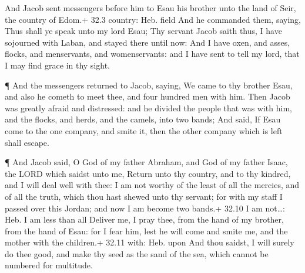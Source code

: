  And Jacob sent messengers before him to Esau his brother
unto the land of Seir, the country of Edom.+ 32.3 country: Heb. field
 And he commanded them, saying, Thus shall ye speak unto my
lord Esau; Thy servant Jacob saith thus, I have sojourned with Laban,
and stayed there until now:  And I have oxen, and asses,
flocks, and menservants, and womenservants: and I have sent to tell my
lord, that I may find grace in thy sight.

 ¶ And the messengers returned to Jacob, saying, We came to
thy brother Esau, and also he cometh to meet thee, and four hundred men
with him.  Then Jacob was greatly afraid and distressed: and
he divided the people that was with him, and the flocks, and herds, and
the camels, into two bands;  And said, If Esau come to the
one company, and smite it, then the other company which is left shall
escape.

 ¶ And Jacob said, O God of my father Abraham, and God of my
father Isaac, the LORD which saidst unto me, Return unto thy country,
and to thy kindred, and I will deal well with thee:  I am
not worthy of the least of all the mercies, and of all the truth, which
thou hast shewed unto thy servant; for with my staff I passed over this
Jordan; and now I am become two bands.+ 32.10 I am not\ldots: Heb. I am
less than all  Deliver me, I pray thee, from the hand of my
brother, from the hand of Esau: for I fear him, lest he will come and
smite me, and the mother with the children.+ 32.11 with: Heb. upon
 And thou saidst, I will surely do thee good, and make thy
seed as the sand of the sea, which cannot be numbered for multitude.

